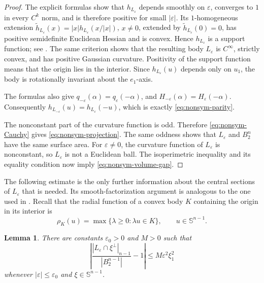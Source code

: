 \documentclass[11pt]{article}
\newtheorem{lemma}[theorem]{Lemma}
\theoremstyle{remark}
\newcommand{\Sph}{\mathbb{S}}
\begin{document}
\begin{proof}
The explicit formulas show that $h_{L_\varepsilon}$ depends smoothly on
$\varepsilon$, converges to $1$ in every $C^k$ norm, and is therefore
positive for small $|\varepsilon|$.  Its $1$-homogeneous extension
$\widetilde h_{L_\varepsilon}(x)
=|x|h_{L_\varepsilon}(x/|x|)$, $x\ne0$, extended by
$\widetilde h_{L_\varepsilon}(0)=0$, has positive semidefinite Euclidean
Hessian and is convex.  Hence $h_{L_\varepsilon}$ is a support function; see
\cite[Sections~1.7 and~2.5]{SchneiderBook}.  The same criterion shows that
the resulting body $L_\varepsilon$ is $C^\infty$, strictly convex, and has
positive Gaussian curvature.  Positivity of the support function means
that the origin lies in the interior.  Since $h_{L_\varepsilon}(u)$ depends
only on $u_1$, the body is rotationally invariant about the $e_1$-axis.

The formulas also give
$
 q_{-\varepsilon}(\alpha)=q_\varepsilon(-\alpha)$, and 
 $H_{-\varepsilon}(\alpha)=H_\varepsilon(-\alpha)$. 
Consequently $h_{L_{-\varepsilon}}(u)=h_{L_\varepsilon}(-u)$, which is exactly
\eqref{eq:nonsym-parity}.

The nonconstant part of the curvature function is odd.  Therefore
\eqref{eq:nonsym-Cauchy} gives \eqref{eq:nonsym-projection}.  The same oddness shows that $L_\varepsilon$ and $B_2^n$  have the same surface area. For
$\varepsilon\ne0$, the curvature function of $L_\varepsilon$ is
nonconstant, so $L_\varepsilon$ is not a Euclidean ball. The
isoperimetric inequality and its equality condition
\cite[p.~382]{SchneiderBook} now imply
\eqref{eq:nonsym-volume-gap}.
\end{proof}

The following estimate is the only further information about the central
sections of $L_\varepsilon$ that is needed.  Its smooth-factorization argument
is analogous to the one used in
\cite[Lemma~3.3]{NazarovRyaboginZvavitchLocal}. 
Recall that the radial function of a convex body $K$ containing the
origin in its interior is
\[
 \rho_K(u)=\max\{\lambda\geq0:\lambda u\in K\},
 \qquad u\in\Sph^{n-1}.
\]


\begin{lemma}\label{lem:nonsym-section-factorization}
There are constants $\varepsilon_0>0$ and $M>0$ such that
\begin{equation}\label{eq:nonsym-section-factorization}
 \left|
 \frac{|L_\varepsilon\cap\xi^\perp|_{n-1}}{|B_2^{n-1}|}-1
 \right|
 \leq M\varepsilon^2\xi_1^2
\end{equation}
whenever $|\varepsilon|\leq\varepsilon_0$ and $\xi\in\Sph^{n-1}$.
\end{lemma}
\end{document}
